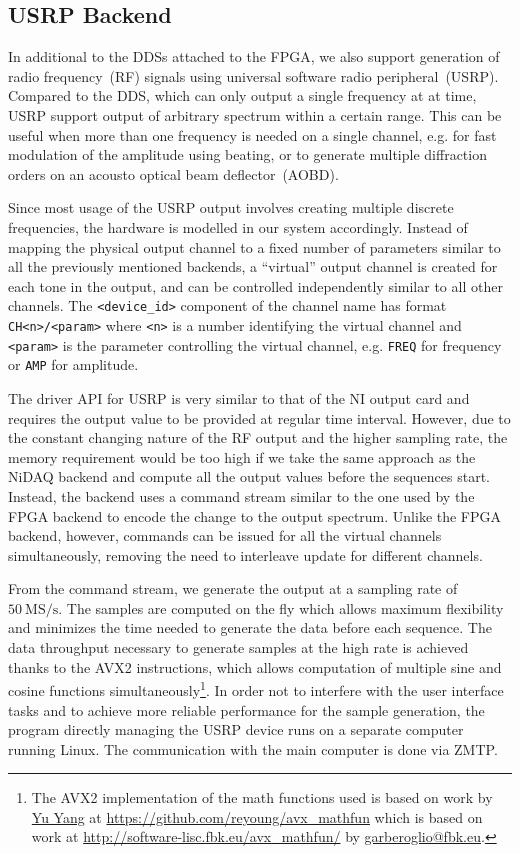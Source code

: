 \subsection{USRP Backend}
\label{ch:computer-control:backend:usrp}

In additional to the DDSs attached to the FPGA, we also support generation of
radio frequency~(RF) signals using universal software radio peripheral~(USRP).
Compared to the DDS, which can only output a single frequency at at time,
USRP support output of arbitrary spectrum within a certain range.
This can be useful when more than one frequency is needed on a single channel,
e.g. for fast modulation of the amplitude using beating,
or to generate multiple diffraction orders on an acousto optical beam deflector~(AOBD).

Since most usage of the USRP output involves creating multiple discrete frequencies,
the hardware is modelled in our system accordingly.
Instead of mapping the physical output channel to a fixed number of parameters
similar to all the previously mentioned backends,
a ``virtual'' output channel is created for each tone in the output,
and can be controlled independently similar to all other channels.
The \verb`<device_id>` component of the channel name has format \verb`CH<n>/<param>`
where \verb`<n>` is a number identifying the virtual channel
and \verb`<param>` is the parameter controlling the virtual channel,
e.g. \verb`FREQ` for frequency or \verb`AMP` for amplitude.

The driver API for USRP is very similar to that of the NI output card
and requires the output value to be provided at regular time interval.
However, due to the constant changing nature of the RF output and the higher sampling rate,
the memory requirement would be too high if we take the same approach as the NiDAQ backend
and compute all the output values before the sequences start.
Instead, the backend uses a command stream similar to the one used by the FPGA backend
to encode the change to the output spectrum.
Unlike the FPGA backend, however, commands can be issued
for all the virtual channels simultaneously,
removing the need to interleave update for different channels.

From the command stream, we generate the output at a sampling rate of $50~\mathrm{MS/s}$.
The samples are computed on the fly which allows maximum flexibility
and minimizes the time needed to generate the data before each sequence.
The data throughput necessary to generate samples at the high rate is achieved
thanks to the AVX2 instructions,
which allows computation of multiple sine and cosine functions simultaneously\footnote{
  The AVX2 implementation of the math functions used is based on work by
  \href{https://github.com/reyoung}{Yu Yang} at \url{https://github.com/reyoung/avx_mathfun}
  which is based on work at \url{http://software-lisc.fbk.eu/avx_mathfun/}
  by \href{mailto:garberoglio@fbk.eu}{garberoglio@fbk.eu}.
}. In order not to interfere with the user interface tasks
and to achieve more reliable performance for the sample generation,
the program directly managing the USRP device runs on a separate computer running Linux.
The communication with the main computer is done via ZMTP.

